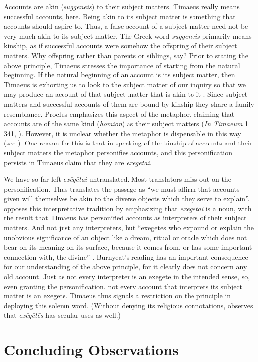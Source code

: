 Accounts are akin (\emph{suggeneis}) to their subject matters. Timaeus really means successful accounts, here. Being akin to its subject matter is something that accounts should aspire to. Thus, a false account of a subject matter need not be very much akin to its subject matter. The Greek word \emph{suggeneis} primarily means kinship, as if successful accounts were somehow the offspring of their subject matters. Why offspring rather than parents or siblings, say? Prior to stating the above principle, Timaeus stresses the importance of starting from the natural beginning. If the natural beginning of an account is its subject matter, then Timaeus is exhorting us to look to the subject matter of our inquiry so that we may produce an account of that subject matter that is akin to it \citep[120--1]{Bryan:2012bt}. Since subject matters and successful accounts of them are bound by kinship they share a family resemblance. Proclus emphasizes this aspect of the metaphor, claiming that accounts are of the same kind (\emph{homion}) as their subject matters (\emph{In Timaeum} 1 341, \citealt{Diehl:1903re}). However, it is unclear whether the metaphor is dispensable in this way (see \citealt[122]{Bryan:2012bt}). One reason for this is that in speaking of the kinship of accounts and their subject matters the metaphor personifies accounts, and this personification persists in Timaeus claim that they are \emph{exēgētai}.

We have so far left \emph{exēgētai} untranslated. Most translators miss out on the personification. Thus \citet[53]{Bury:1929jb} translates the passage as ``we must affirm that accounts given will themselves be akin to the diverse objects which they serve to explain''. \citet[]{Burnyeat:2005it} opposes this interpretative tradition by emphasizing that \emph{exēgētai} is a noun, with the result that Timaeus has personified accounts as interpreters of their subject matters. And not just any interpreters, but ``exegetes who expound or explain the unobvious significance of an object like a dream, ritual or oracle which does not bear on its meaning on its surface, because it comes from, or has some important connection with, the divine'' \citep[149]{Burnyeat:2005it}. Burnyeat's reading has an important consequence for our understanding of the above principle, for it clearly does not concern any old account. Just as not every interpreter is an exegete in the intended sense, so, even granting the personification, not every account that interprets its subject matter is an exegete. Timaeus thus signals a restriction on the principle in deploying this solemn word. (Without denying its religious connotations, \citealt[216--7]{Betegh:2010aa} observes that \emph{exēgētēs} has secular uses as well.)


\section{Concluding Observations} %
\label{sec:concluding_observations}




